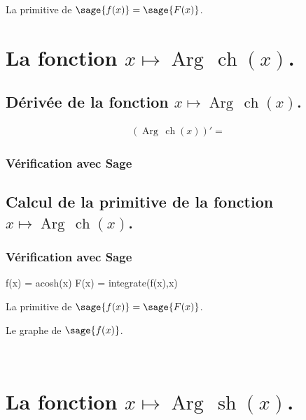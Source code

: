 \documentclass[a4paper,14pt]{extreport} %
\renewcommand{\sinh}{\mathop{\mathrm{sh}}}
\renewcommand{\cosh}{\mathop{\mathrm{ch}}}
\renewcommand{\arg}{\mathop{\mathrm{Arg\,}}}
\begin{document}
La primitive de $\sage{f(x)} = \sage{F(x)} $.




\section{La fonction  $x \mapsto \arg \cosh(x)$.}


\subsection{Dérivée de la fonction $x \mapsto \arg \cosh(x)$.}

\begin{align*}
(\arg \cosh(x))' = &
\end{align*}


\subsubsection{Vérification avec Sage}


\subsection{Calcul de la primitive de la fonction  $x \mapsto \arg \cosh(x)$.}



\subsubsection{Vérification avec Sage}

\begin{sageblock}
    f(x) = acosh(x)
    F(x) = integrate(f(x),x)
\end{sageblock}


La primitive de $\sage{f(x)} = \sage{F(x)} $.

Le graphe de $\sage{f(x)} $.


\begin{center}
 \\
\end{center}







\section{La fonction  $x \mapsto \arg \sinh(x)$.}
\end{document}
